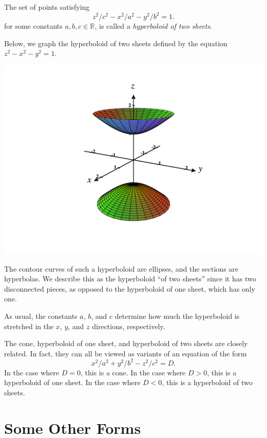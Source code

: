 \documentclass{ximera}
\begin{document}
\begin{example}
The set of points satisfying
\[
z^2/c^2 -x^2/a^2 - y^2/b^2 =1.
\]
for some constants $a,b,c\in\mathbb{R}$, is called a \emph{hyperboloid of two sheets}.

Below, we graph the hyperboloid of two sheets defined by the equation $z^2-x^2-y^2=1$.

\begin{image}
\includegraphics[width=\textwidth]{CalcPlot3D-hyperboloid2}
\end{image}

The contour curves of such a hyperboloid are ellipses, and the sections are hyperbolas. We describe this as the hyperboloid ``of two sheets'' since it has two disconnected pieces, as opposed to the hyperboloid of one sheet, which has only one.

As usual, the constants $a$, $b$, and $c$ determine how much the hyperboloid is stretched in the $x$, $y$, and $z$ directions, respectively.
\end{example}

The cone, hyperboloid of one sheet, and hyperboloid of two sheets are closely related. In fact, they can all be viewed as variants of an equation of the form
\[
x^2/a^2+y^2/b^2-z^2/c^2=D.
\]
In the case where $D=0$, this is a cone. In the case where $D>0$, this is a hyperboloid of one sheet. In the case where $D<0$, this is a hyperboloid of two sheets.

\section*{Some Other Forms}
\end{document}
